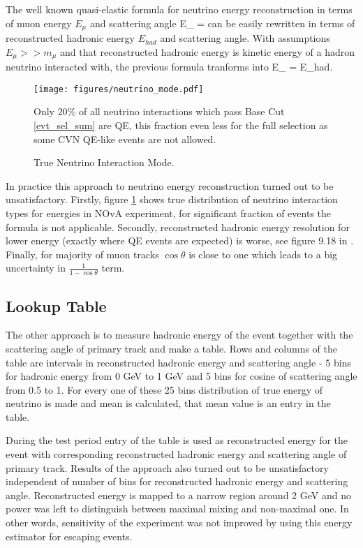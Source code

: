 The well known quasi-elastic formula for neutrino energy reconstruction in terms of muon
energy $E_\mu$ and scattering angle %
\be
E_{\nu} = 
\ee
can be easily rewritten in terms of reconstructed hadronic energy $E_{had}$ and 
scattering angle. With assumptions $E_\mu >> m_\mu$ and that reconstructed hadronic 
energy is kinetic energy of a hadron neutrino interacted with, the previous formula 
tranforms into
\be
E_{\nu} = E_{had}.
\ee
\begin{figure}[!th]
\centering
\texttt{[image: figures/neutrino\_mode.pdf]}
\caption{True Neutrino Interaction Mode.}
{Only $20\%$ of all neutrino interactions which pass Base Cut \ref{evt_sel_sum} are QE, this
fraction even less for the full selection as some CVN QE-like events are not allowed.}
\label{fig:trueInt}
\end{figure}

In practice this approach to neutrino energy reconstruction turned out to be unsatisfactory.
Firstly, figure \ref{fig:trueInt} shows true distribution of neutrino interaction types for
energies in NOvA experiment, for significant fraction of events the formula is not applicable. 
Secondly, reconstructed hadronic energy resolution for lower energy (exactly where QE
events are expected) is worse, see figure 9.18 in \cite{Susan}. Finally, for majority
of muon tracks $\cos\theta$ is close to one which leads to a big uncertainty in 
$\frac{1}{1-\cos\theta}$ term.

\subsection{Lookup Table}
The other approach is to measure hadronic energy of the event together with the scattering
angle of primary track and make a table. Rows and columns of the table are intervals in
reconstructed hadronic energy and scattering angle - 5 bins for hadronic energy from 0 GeV 
to 1 GeV and 5 bins for cosine of scattering angle from 0.5 to 1. For every one of these 25
bins distribution of true energy of neutrino is made and mean is calculated, that mean value
is an entry in the table.

During the test period entry of the table is used as reconstructed energy for the event
with corresponding reconstructed hadronic energy and scattering angle of primary track. 
Results of the approach also turned out to be unsatisfactory independent of number of bins
for reconstructed hadronic energy and scattering angle. Reconstructed energy is mapped to
a narrow region around 2 GeV and no power was left to distinguish between maximal mixing and
non-maximal one. In other words, sensitivity of the experiment was not improved by using 
this energy estimator for escaping events.

